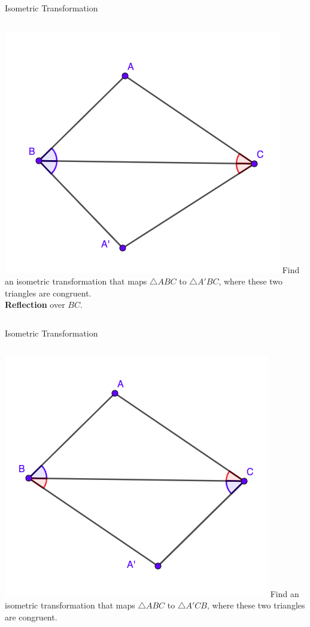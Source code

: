 \documentclass{beamer}
\begin{document}
\begin{frame}{Isometric Transformation}
	\begin{columns}
		\includegraphics[scale=0.4]{iso1.png}
		Find an isometric transformation that maps $\triangle
		ABC$ to $\triangle A'BC$, where these two triangles
		are congruent.\\
		\phantom{Spacing}
		\textbf{Reflection} over $BC$.
	\end{columns}
\end{frame}
\begin{frame}{Isometric Transformation}
	\begin{columns}
		\column{0.6\textwidth}
		\includegraphics[scale=0.4]{iso2.png}
		\column{0.4\textwidth}
		Find an isometric transformation that maps $\triangle
		ABC$ to $\triangle A'CB$, where these two triangles
		are congruent.
	\end{columns}
\end{frame}
\end{document}

